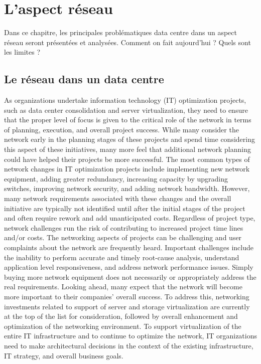 \chapter{L'aspect réseau}
Dans ce chapitre, les principales problématiques data centre dans un aspect réseau seront présentées et analysées.  Comment on fait aujourd'hui ? Quels sont les limites ? 


\section{Le réseau dans un data centre}
As organizations undertake information technology (IT) optimization projects, such as data center consolidation and server virtualization, they need to ensure that the proper level of focus is given to the critical role of the network in terms of planning, execution, and overall project success. While many consider the network early in the planning stages of these projects and spend time considering this aspect of these initiatives, many more feel that additional network planning could have helped their projects be more successful.
The most common types of network changes in IT optimization projects include implementing new network equipment, adding greater redundancy, increasing capacity by upgrading switches, improving network security, and adding network bandwidth. However, many network requirements associated with these changes and the overall initiative are typically not identified until after the initial stages of the project and often require rework and add unanticipated costs. Regardless of project type, network challenges run the risk of contributing to increased project time lines and/or costs.
The networking aspects of projects can be challenging and user complaints about the network are frequently heard. Important challenges include the inability to perform accurate and timely root-cause analysis, understand application level responsiveness, and address network performance issues. Simply buying more network equipment does not necessarily or appropriately address the real requirements.
Looking ahead, many expect that the network will become more important to their companies' overall success. To address this, networking investments related to support of server and storage virtualization are currently at the top of the list for consideration, followed by overall enhancement and optimization of the networking environment.
To support virtualization of the entire IT infrastructure and to continue to optimize the network, IT organizations need to make architectural decisions in the context of the existing infrastructure, IT strategy, and overall business goals.
